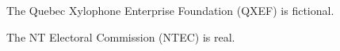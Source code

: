\documentclass{grattan}
\begin{document}
The Quebec Xylophone Enterprise Foundation (QXEF) is fictional.

The NT Electoral Commission (NTEC) is real.
\end{document}
